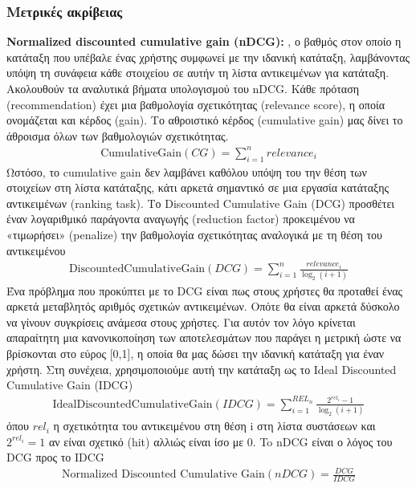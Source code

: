 \subsubsection{Μετρικές ακρίβειας}
\noindent\textbf{Normalized discounted cumulative gain (nDCG):} \cite{jarvelinCumulatedGainbasedEvaluation2002},  \cite{jarvelinIREvaluationMethods2000} ο βαθμός στον οποίο η κατάταξη που υπέβαλε ένας χρήστης συμφωνεί με την ιδανική κατάταξη, λαμβάνοντας υπόψη τη συνάφεια κάθε στοιχείου σε αυτήν τη λίστα αντικειμένων για κατάταξη. Ακολουθούν τα αναλυτικά βήματα υπολογισμού του nDCG.
Κάθε πρόταση (recommendation) έχει μια βαθμολογία σχετικότητας (relevance score), η οποία ονομάζεται και κέρδος (gain). Το  αθροιστικό κέρδος (cumulative gain) μας δίνει το άθροισμα όλων των βαθμολογιών σχετικότητας.
\begin{align}
	\text{CumulativeGain}\left(CG\right)= \sum_{i=1}^{n}{relevance}_i
\end{align}
Ωστόσο, το cumulative gain δεν λαμβάνει καθόλου υπόψη του την θέση των στοιχείων στη λίστα κατάταξης, κάτι αρκετά σημαντικό σε μια εργασία κατάταξης αντικειμένων (ranking task). Το Discounted Cumulative Gain (DCG) προσθέτει έναν λογαριθμικό παράγοντα αναγωγής (reduction factor) προκειμένου να «τιμωρήσει» (penalize) την βαθμολογία σχετικότητας αναλογικά με τη θέση του αντικειμένου
\begin{align}
	\text{DiscountedCumulativeGain}\left(DCG\right)= \sum_{i=1}^{n}\frac{{relevance}_i}{\log_2{\left(i+1\right)}}
\end{align}
Ένα πρόβλημα που προκύπτει με το DCG είναι πως στους χρήστες θα προταθεί ένας αρκετά μεταβλητός αριθμός σχετικών αντικειμένων. Οπότε θα είναι αρκετά δύσκολο να γίνουν συγκρίσεις ανάμεσα στους χρήστες. Για αυτόν τον λόγο κρίνεται απαραίτητη μια κανονικοποίηση των αποτελεσμάτων που παράγει η μετρική ώστε να βρίσκονται στο εύρος [0,1], η οποία θα μας δώσει την ιδανική κατάταξη για έναν χρήστη. Στη συνέχεια, χρησιμοποιούμε αυτή την κατάταξη ως το Ideal Discounted Cumulative Gain (IDCG)
\begin{align}
	\text{IdealDiscountedCumulativeGain}\left(IDCG\right)= \sum_{i=1}^{REL_n}\frac{2^{{rel}_i}-1}{\log_2{\left(i+1\right)}} 
\end{align}
όπου $ {rel}_i $ η σχετικότητα του αντικειμένου στη θέση i στη λίστα συστάσεων και $ 2^{{rel}_i}=1 $ αν είναι σχετικό (hit) αλλιώς είναι ίσο με 0.
To nDCG είναι ο λόγος του DCG προς το IDCG
\begin{align}
	\text{Normalized Discounted Cumulative Gain}\left(nDCG\right)=\frac{DCG}{IDCG}
\end{align}
